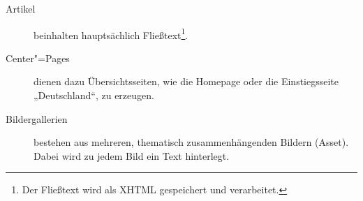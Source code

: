 \begin{description}
  
  \item[Artikel] beinhalten hauptsächlich Fließtext\footnote{Der Fließtext
    wird als XHTML gespeichert und verarbeitet.}. 


  \item[Center"=Pages] dienen dazu Übersichtsseiten, wie die Homepage oder die
    Einstiegsseite „Deutschland“, zu erzeugen. 

  \item[Bildergallerien] bestehen aus mehreren, thematisch zusammenhängenden
    Bildern (Asset). Dabei wird zu jedem Bild ein Text hinterlegt. 

\end{description}

